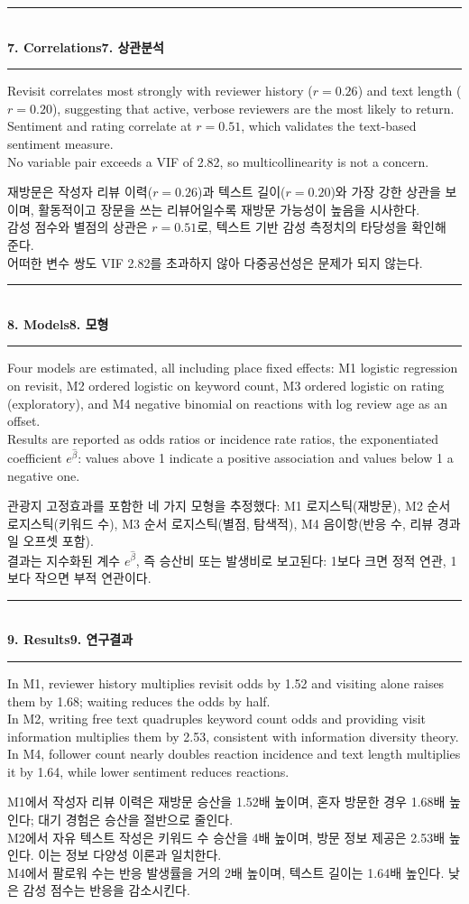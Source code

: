 \documentclass[10pt,a4paper]{article}
\newcommand{\sechead}[2]{%
  \vspace{6pt}%
  \noindent\rule{\linewidth}{0.6pt}\\[1pt]
  {\small\bfseries #1\hfill #2}\\[-3pt]
  \rule{\linewidth}{0.4pt}\par\vspace{2pt}%
}
\newcommand{\sent}[1]{#1\\[5pt]}
\newcommand{\bilingual}[2]{%
  \noindent%
  \begin{minipage}[t]{0.485\linewidth}
    \small #1
  \end{minipage}\hfill\vrule\hfill%
  \begin{minipage}[t]{0.483\linewidth}
    \small #2
  \end{minipage}\par\vspace{4pt}%
}
\begin{document}
\sechead{7. Correlations}{7. 상관분석}
\bilingual{%
  \sent{Revisit correlates most strongly with reviewer history ($r = 0.26$) and text length ($r = 0.20$), suggesting that active, verbose reviewers are the most likely to return.}
  \sent{Sentiment and rating correlate at $r = 0.51$, which validates the text-based sentiment measure.}
  \sent{No variable pair exceeds a VIF of 2.82, so multicollinearity is not a concern.}
}{%
  \sent{재방문은 작성자 리뷰 이력($r = 0.26$)과 텍스트 길이($r = 0.20$)와 가장 강한 상관을 보이며, 활동적이고 장문을 쓰는 리뷰어일수록 재방문 가능성이 높음을 시사한다.}
  \sent{감성 점수와 별점의 상관은 $r = 0.51$로, 텍스트 기반 감성 측정치의 타당성을 확인해 준다.}
  \sent{어떠한 변수 쌍도 VIF 2.82를 초과하지 않아 다중공선성은 문제가 되지 않는다.}
}

\sechead{8. Models}{8. 모형}
\bilingual{%
  \sent{Four models are estimated, all including place fixed effects: M1 logistic regression on revisit, M2 ordered logistic on keyword count, M3 ordered logistic on rating (exploratory), and M4 negative binomial on reactions with log review age as an offset.}
  \sent{Results are reported as odds ratios or incidence rate ratios, the exponentiated coefficient $e^{\hat\beta}$: values above 1 indicate a positive association and values below 1 a negative one.}
}{%
  \sent{관광지 고정효과를 포함한 네 가지 모형을 추정했다: M1 로지스틱(재방문), M2 순서 로지스틱(키워드 수), M3 순서 로지스틱(별점, 탐색적), M4 음이항(반응 수, 리뷰 경과일 오프셋 포함).}
  \sent{결과는 지수화된 계수 $e^{\hat\beta}$, 즉 승산비 또는 발생비로 보고된다: 1보다 크면 정적 연관, 1보다 작으면 부적 연관이다.}
}

\sechead{9. Results}{9. 연구결과}
\bilingual{%
  \sent{In M1, reviewer history multiplies revisit odds by 1.52 and visiting alone raises them by 1.68; waiting reduces the odds by half.}
  \sent{In M2, writing free text quadruples keyword count odds and providing visit information multiplies them by 2.53, consistent with information diversity theory.}
  \sent{In M4, follower count nearly doubles reaction incidence and text length multiplies it by 1.64, while lower sentiment reduces reactions.}
}{%
  \sent{M1에서 작성자 리뷰 이력은 재방문 승산을 1.52배 높이며, 혼자 방문한 경우 1.68배 높인다; 대기 경험은 승산을 절반으로 줄인다.}
  \sent{M2에서 자유 텍스트 작성은 키워드 수 승산을 4배 높이며, 방문 정보 제공은 2.53배 높인다. 이는 정보 다양성 이론과 일치한다.}
  \sent{M4에서 팔로워 수는 반응 발생률을 거의 2배 높이며, 텍스트 길이는 1.64배 높인다. 낮은 감성 점수는 반응을 감소시킨다.}
}
\end{document}
